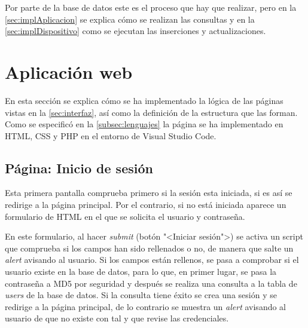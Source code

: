Por parte de la base de datos este es el proceso que hay que realizar, pero en la \autoref{sec:implAplicacion} se explica cómo se realizan las consultas y en la \autoref{sec:implDispositivo} como se ejecutan las inserciones y actualizaciones.

\section{Aplicación web}\label{sec:implAplicacion}
En esta sección se explica cómo se ha implementado la lógica de las páginas vistas en la \autoref{sec:interfaz}, así como la definición de la estructura que las forman. Como se especificó en la \autoref{subsec:lenguajes} la página se ha implementado en HTML, CSS y PHP en el entorno de Visual Studio Code.

\subsection{Página: Inicio de sesión}\label{subsec:página-inicio-de-sesión}
Esta primera pantalla comprueba primero si la sesión esta iniciada, si es así se redirige a la página principal. Por el contrario, si no está iniciada aparece un formulario de HTML en el que se solicita el usuario y contraseña. 

En este formulario, al hacer \textit{submit} (botón "<Iniciar sesión">) se activa un script que comprueba si los campos han sido rellenados o no, de manera que salte un \textit{alert} avisando al usuario. Si los campos están rellenos, se pasa a comprobar si el usuario existe en la base de datos, para lo que, en primer lugar, se pasa la contraseña a MD5 por seguridad y después se realiza una consulta a la tabla de \textit{users} de la base de datos. Si la consulta tiene éxito se crea una sesión y se redirige a la página principal, de lo contrario se muestra un \textit{alert} avisando al usuario de que no existe con tal y que revise las credenciales.

